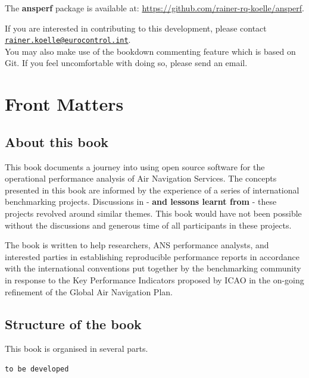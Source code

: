 \documentclass[
]{book}
\begin{document}
The \textbf{ansperf} package is available at: \url{https://github.com/rainer-rq-koelle/ansperf}.

If you are interested in contributing to this development, please contact \href{mailto:rainer.koelle@eurocontrol.int}{\nolinkurl{rainer.koelle@eurocontrol.int}}.\\
You may also make use of the bookdown commenting feature which is based on Git.
If you feel uncomfortable with doing so, please send an email.

\hypertarget{front-matters}{%
\chapter*{Front Matters}\label{front-matters}}

\hypertarget{about-this-book}{%
\section*{About this book}\label{about-this-book}}

This book documents a journey into using open source software for the operational performance analysis of Air Navigation Services.
The concepts presented in this book are informed by the experience of a series of international benchmarking projects.
Discussions in - \textbf{and lessons learnt from} - these projects revolved around similar themes. This book would have not been possible without the discussions and generous time of all participants in these projects.

The book is written to help researchers, ANS performance analysts, and interested parties in establishing reproducible performance reports in accordance with the international conventions put together by the benchmarking community in response to the Key Performance Indicators proposed by ICAO in the on-going refinement of the Global Air Navigation Plan.

\hypertarget{structure-of-the-book}{%
\section*{Structure of the book}\label{structure-of-the-book}}

This book is organised in several parts.

\begin{verbatim}
to be developed
\end{verbatim}
\end{document}
